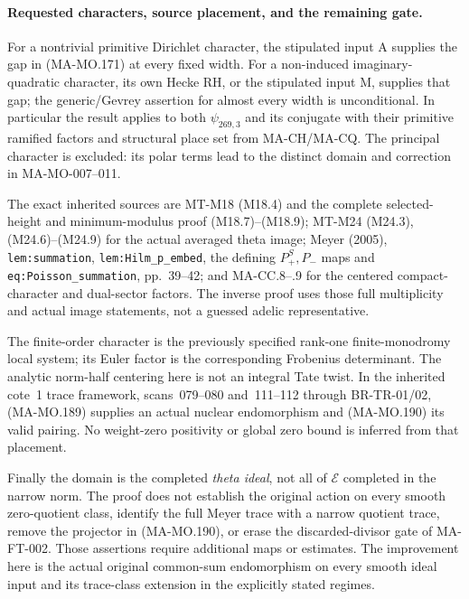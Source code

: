 \paragraph{Requested characters, source placement, and the remaining gate.}
For a nontrivial primitive Dirichlet character, the stipulated
input A supplies the gap in (MA-MO.171) at every fixed width.
For a non-induced imaginary-quadratic character, its own
Hecke RH, or the stipulated input M, supplies that gap;
the generic/Gevrey assertion for almost every width is
unconditional. In particular the result applies to both
\(\psi_{269,3}\) and its conjugate with their primitive
ramified factors and structural place set from MA-CH/MA-CQ.
The principal character is excluded: its polar terms lead
to the distinct domain and correction in MA-MO-007--011.

The exact inherited sources are MT-M18 (M18.4) and the
complete selected-height and minimum-modulus proof
(M18.7)--(M18.9); MT-M24 (M24.3), (M24.6)--(M24.9) for
the actual averaged theta image; Meyer (2005),
\texttt{lem:summation}, \texttt{lem:Hilm\_p\_embed}, the
defining \(P_+^S,P_-\) maps and
\texttt{eq:Poisson\_summation}, pp.~39--42; and MA-CC.8--.9
for the centered compact-character and dual-sector factors.
The inverse proof uses those full multiplicity and actual
image statements, not a guessed adelic representative.

The finite-order character is the previously specified
rank-one finite-monodromy local system; its Euler factor
is the corresponding Frobenius determinant. The analytic
norm-half centering here is not an integral Tate twist.
In the inherited cote~1 trace framework, scans~079--080
and~111--112 through BR-TR-01/02, (MA-MO.189) supplies an
actual nuclear endomorphism and (MA-MO.190) its valid
pairing. No weight-zero positivity or global zero bound
is inferred from that placement.

Finally the domain is the completed \emph{theta ideal},
not all of \(\mathcal E\) completed in the narrow norm.
The proof does not establish the original action on every
smooth zero-quotient class, identify the full Meyer trace
with a narrow quotient trace, remove the projector in
(MA-MO.190), or erase the discarded-divisor gate of
MA-FT-002. Those assertions require additional maps or
estimates. The improvement here is the actual original
common-sum endomorphism on every smooth ideal input and
its trace-class extension in the explicitly stated regimes.
